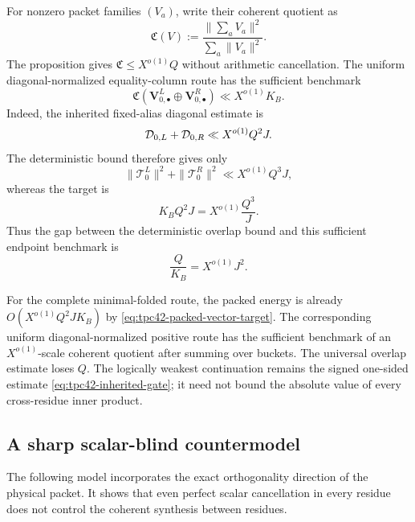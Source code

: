 For nonzero packet families \((V_a)\), write their coherent quotient as
\begin{equation}
 \mathfrak C(V)
 :=\frac{\|\sum_aV_a\|^2}{\sum_a\|V_a\|^2}.
 \label{eq:tpc42-coherent-quotient}
\end{equation}
The proposition gives \(\mathfrak C\le X^{o(1)}Q\) without arithmetic
cancellation.  The uniform diagonal-normalized equality-column route has
the sufficient benchmark
\begin{equation}
 \mathfrak C(\mathbf V_{0,\bullet}^L\oplus
             \mathbf V_{0,\bullet}^R)
 \ll X^{o(1)}K_B.
 \label{eq:tpc42-equality-required-coherence}
\end{equation}
Indeed, the inherited fixed-alias diagonal estimate is
\begin{equation}
 \mathcal D_{0,L}+\mathcal D_{0,R}\ll X^{o(1)}Q^2J.
 \label{eq:tpc42-equality-diagonal}
\end{equation}
The deterministic bound therefore gives only
\begin{equation}
 \|\mathscr T_0^L\|^2+\|\mathscr T_0^R\|^2
 \ll X^{o(1)}Q^3J,
 \label{eq:tpc42-equality-coherent-scale}
\end{equation}
whereas the target is
\begin{equation}
 K_BQ^2J
 =X^{o(1)}\frac{Q^3}{J}.
 \label{eq:tpc42-equality-target-scale}
\end{equation}
Thus the gap between the deterministic overlap bound and this sufficient
endpoint benchmark is
\begin{equation}
 \boxed{\frac Q{K_B}=X^{o(1)}J^2.}
 \label{eq:tpc42-exact-J2-defect}
\end{equation}

For the complete minimal-folded route, the packed energy is already
\(O(X^{o(1)}Q^2JK_B)\) by
\eqref{eq:tpc42-packed-vector-target}.  The corresponding uniform
diagonal-normalized positive route has the sufficient benchmark of an
\(X^{o(1)}\)-scale coherent quotient after summing over buckets.  The
universal overlap estimate loses \(Q\).  The
logically weakest continuation remains the signed one-sided estimate
\eqref{eq:tpc42-inherited-gate}; it need not bound the absolute value of
every cross-residue inner product.

\subsection{A sharp scalar-blind countermodel}

The following model incorporates the exact orthogonality direction of the
physical packet.  It shows that even perfect scalar cancellation in every
residue does not control the coherent synthesis between residues.

